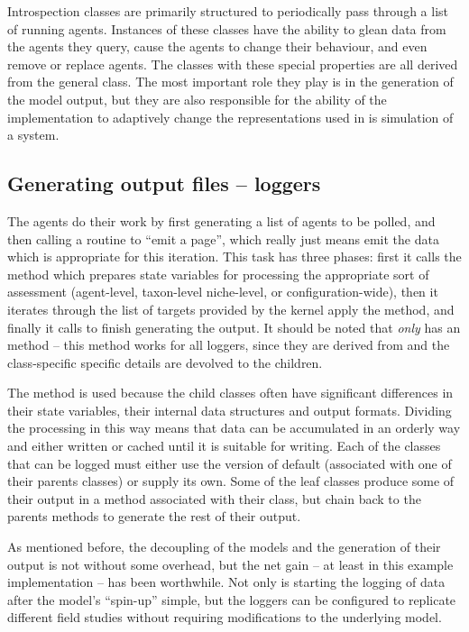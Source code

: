 Introspection classes are primarily structured to periodically pass
through a list of running agents.  Instances of these classes have the
ability to glean data from the agents they query, cause the agents to
change their behaviour, and even remove or replace agents.  The
classes with these special properties are all derived from the
general  class.  The most important role they
play is in the generation of the model output, but they are also
responsible for the ability of the implementation to adaptively change the
representations used in is simulation of a system.


\subsection{Generating output files -- loggers}

The  agents do their work by first generating a list of
agents to be polled, and then calling a routine to ``emit a page'',
which really just means emit the data which is appropriate for this
iteration.  This task has three phases: first it calls the
method  which prepares state variables for
processing the appropriate sort of assessment (agent-level,
taxon-level niche-level, or configuration-wide), then it iterates
through the list of targets provided by the kernel apply
the  method, and finally it
calls  to finish generating the output.  It
should be noted that \emph{only\/}  has
an  method -- this method works for all loggers,
since they are derived from  and the class-specific
specific details are devolved to the children.

The method  is used because the child classes often
have significant differences in their state variables, their internal
data structures and output formats.  Dividing the processing in this
way means that data can be accumulated in an orderly way and either
written or cached until it is suitable for writing.  Each of the
classes that can be logged must either use the
 version of
default  (associated with one of their parents
classes) or supply its own.  Some of the leaf classes produce some of
their output in a  method associated with their
class, but chain back to the parents  methods to
generate the rest of their output.

As mentioned before, the decoupling of the models and the generation
of their output is not without some overhead, but the net gain -- at
least in this example implementation -- has been worthwhile. Not only
is starting the logging of data after the model's ``spin-up'' simple,
but the loggers can be configured to replicate different field studies
without requiring modifications to the underlying model.


